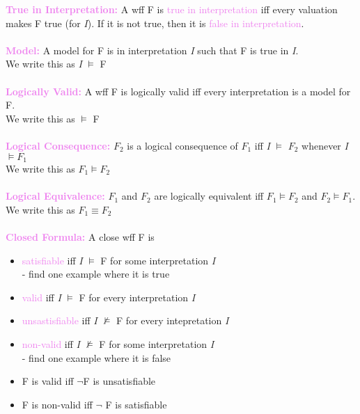\documentclass[a4paper,10pt]{article}
\begin{document}
\noindent \textcolor{Violet}{\textbf{True in Interpretation:}} A wff F is \textcolor{Violet}{true in interpretation} iff every valuation makes F true (for \emph{I}). If it is not true, then it is \textcolor{Violet}{false in interpretation}.  \\ \\
\noindent \textcolor{Violet}{\textbf{Model:}} A model for F is in interpretation \emph{I} such that F is true in \emph{I}. \\
We write this as \emph{I} $\models$ F\\ \\
\noindent \textcolor{Violet}{\textbf{Logically Valid:}} A wff F is logically valid iff every interpretation is a model for F. \\
We write this as $\models$ F\\ \\
\noindent \textcolor{Violet}{\textbf{Logical Consequence:}} $F_{2}$ is a logical consequence of $F_{1}$ iff \emph{I} $\models$  $F_{2}$ whenever \emph{I} $\models F_{1}$\\ 
We write this as $F_{1} \models F_{2}$ \\\\
\noindent \textcolor{Violet}{\textbf{Logical Equivalence:}} $F_{1}$ and $F_{2}$ are logically equivalent iff $F_{1} \models F_{2}$ and $F_{2} \models F_{1}$.\\
We write this as $F_{1} \equiv F_{2}$ \\\\
\noindent \textcolor{Violet}{\textbf{Closed Formula:}} A close wff F is
\renewcommand{\labelitemi}{\textperiodcentered}
\begin{itemize}
\item \textcolor{Violet}{satisfiable} iff \emph{I} $\models$ F for some interpretation \emph{I} \\
- find one example where it is true
\item \textcolor{Violet}{valid} iff \emph{I} $\models$ F for every interpretation \emph{I} 
\item \textcolor{Violet}{unsastisfiable} iff \emph{I} $\nvDash$ F for every intepretation \emph{I}
\item \textcolor{Violet}{non-valid} iff \emph{I} $\nvDash$ F for some interpretation \emph{I} \\
- find one example where it is false
\item F is valid iff $\neg$F is unsatisfiable
\item F is non-valid iff $\neg$ F is satisfiable
\end{itemize}
\end{document}
